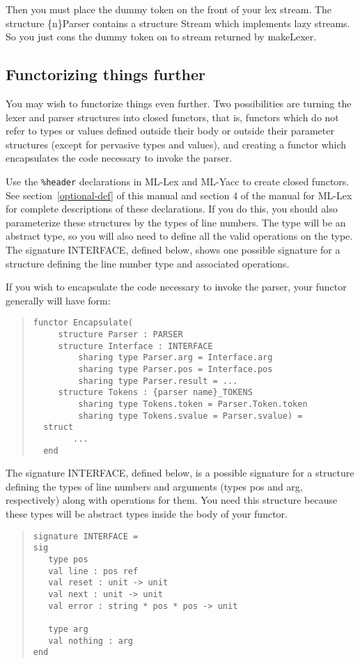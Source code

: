 Then you must place the dummy token on the front of your lex stream.
The structure \{n\}Parser contains a structure Stream which implements
lazy streams.  So you just cons the dummy token on to stream returned
by makeLexer.
\subsection{Functorizing things further}

You may wish to functorize things even further.  Two possibilities
are turning the lexer and parser structures into closed functors,
that is, functors which do not refer to types or values defined
outside their body or outside their parameter structures (except
for pervasive types and values), and creating a functor which
encapsulates the code necessary to invoke the parser.

Use the {\tt \%header} declarations in ML-Lex and ML-Yacc to create
closed functors.  See section~\ref{optional-def} of this manual
and section 4 of the manual for ML-Lex for complete descriptions of these
declarations.  If you do this, you should also parameterize these
structures by the types of line numbers.  The type will be an
abstract type, so you will also need to define all the valid
operations on the type.  The signature INTERFACE, defined below,
shows one possible signature for a structure defining the line
number type and associated operations.

If you wish to encapsulate the code necessary to invoke the
parser, your functor generally will have form:
\begin{quote}
\begin{verbatim}
functor Encapsulate(
     structure Parser : PARSER
     structure Interface : INTERFACE
         sharing type Parser.arg = Interface.arg
         sharing type Parser.pos = Interface.pos
         sharing type Parser.result = ...
     structure Tokens : {parser name}_TOKENS
         sharing type Tokens.token = Parser.Token.token
         sharing type Tokens.svalue = Parser.svalue) =
  struct
        ...
  end
\end{verbatim}
\end{quote}

The signature INTERFACE, defined below, is a possible signature for
a structure
defining the types
of line numbers and arguments (types pos and arg, respectively)
along with operations for them.  You need this structure
because
these types will be abstract types inside the body of your
functor.
\begin{quote}
\begin{verbatim}
signature INTERFACE = 
sig
   type pos
   val line : pos ref
   val reset : unit -> unit
   val next : unit -> unit
   val error : string * pos * pos -> unit

   type arg
   val nothing : arg
end
\end{verbatim}
\end{quote}

